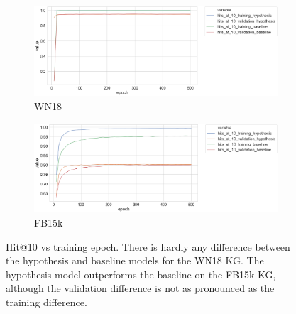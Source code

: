 \begin{figure}[H]
	\begin{subfigure}[b]{.5\linewidth}
   		\centering
    		\includegraphics[width=1.0\linewidth, height=0.6\linewidth]{WN18_hits_at_10_Results}
		\captionsetup{justification=centering}
		\caption{WN18}
	\end{subfigure}
	\begin{subfigure}[b]{.5\linewidth}
   		\centering
		\includegraphics[width=1.0\linewidth, height=0.6\linewidth]{FB15k_hits_at_10_Results}
		\captionsetup{justification=centering}
		\caption{FB15k}
	\end{subfigure}
	\captionsetup{justification=centering}
	\caption{Hit@10 vs training epoch. There is hardly any difference between the hypothesis and baseline models for the WN18 KG. The hypothesis model outperforms the baseline on the FB15k KG, although the validation difference is not as pronounced as the training difference.}
\end{figure}

\bigskip
\bigskip
\bigskip
\bigskip


